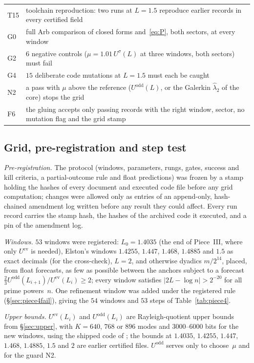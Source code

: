 \documentclass[11pt]{amsart}
\newcommand{\ev}{\mathrm{ev}}
\newcommand{\od}{\mathrm{odd}}
\newcommand{\file}[1]{{\small\path{#1}}}
\theoremstyle{definition}
\theoremstyle{remark}
\numberwithin{equation}{section}
\begin{document}
\begin{table}[ht]
\begin{tabular}{>{\raggedright\arraybackslash}p{}>{\raggedright\arraybackslash}p{}}
T15 & toolchain reproduction: two runs at $L=1.5$ reproduce earlier records in every certified field\\
G0 & full Arb comparison of closed forms and~\eqref{eq:P}, both sectors, at every window\\
G2 & $6$ negative controls ($\mu=1.01\,U^\sigma(L)$ at three windows, both sectors) must fail\\
G4 & $15$ deliberate code mutations at $L=1.5$ must each be caught\\
N2 & a pass with $\mu$ above the reference ($U^\od(L)$, or the Galerkin $\hat\lambda_2$ of the core) stops the grid\\
F6 & the gluing accepts only passing records with the right window, sector, no mutation flag and the grid stamp\\
\bottomrule
\end{tabular}
\end{table}

\subsection{Grid, pre-registration and step test}\label{sec:piece4grid}
\emph{Pre-registration.} The protocol (windows, parameters, rungs, gates, success and kill criteria, a partial-outcome rule and float predictions) was frozen by a stamp holding the hashes of every document and executed code file before any grid computation; changes were allowed only as entries of an append-only, hash-chained amendment log written before any result they could affect. Every run record carries the stamp hash, the hashes of the archived code it executed, and a pin of the amendment log.

\emph{Windows.} $53$ windows were registered: $L_0=1.4035$ (the end of Piece~III, where only $U^\ev$ is needed), Elston's windows $1.4255$, $1.447$, $1.468$, $1.4885$ and $1.5$ as exact decimals (for the cross-check), $L=2$, and otherwise dyadics $m/2^{14}$, placed, from float forecasts, as few as possible between the anchors subject to a forecast $\tfrac23U^\od(L_{i+1})/U^\ev(L_i)\ge2$; every window satisfies $|2L-\log n|>2^{-20}$ for all prime powers~$n$. One refinement window was added under the registered rule (\S\ref{sec:piece4fail}), giving the $54$ windows and $53$ steps of Table~\ref{tab:piece4}.

\emph{Upper bounds.} $U^\ev(L_i)$ and $U^\od(L_i)$ are Rayleigh-quotient upper bounds from \S\ref{sec:upper}, with $K=640$, $768$ or $896$ modes and $3000$--$6000$ bits for the new windows, using the shipped code of \file{code/upper/}; the bounds at $1.4035$, $1.4255$, $1.447$, $1.468$, $1.4885$, $1.5$ and $2$ are earlier certified files. $U^\od$ serves only to choose~$\mu$ and for the guard N2.
\end{document}

